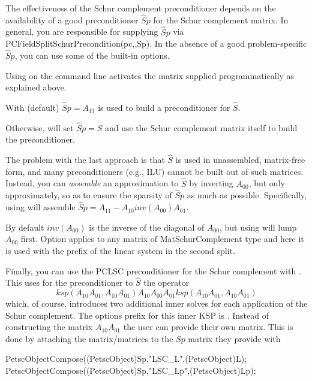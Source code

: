 The effectiveness of the Schur complement preconditioner depends on the availability of a good preconditioner $\hat Sp$ for the Schur complement matrix.
In general, you are responsible for supplying $\hat Sp$ via
PCFieldSplitSchurPrecondition(pc,,Sp).
In the absence of a good
problem-specific $\hat Sp$, you can use some of the built-in options.

Using  on the command line activates
the matrix supplied programmatically as explained above.

With  (default) $\hat Sp = A_{11}$ is used to build a
preconditioner for $\hat S$.

Otherwise,  will set $\hat Sp = \hat S$ and use the Schur complement matrix itself to build the preconditioner.

The problem with the last approach is that $\hat S$ is used in unassembled, matrix-free form, and many preconditioners (e.g., ILU) cannot be built out of
such matrices. Instead, you can \emph{assemble}  an approximation to $\hat S$ by inverting $A_{00}$, but only approximately, so as to ensure the sparsity of $\hat Sp$ as much as possible.
Specifically, using  will assemble $\hat Sp = A_{11} - A_{10} inv(A_{00}) A_{01}$.

By default $inv(A_{00})$ is the inverse of the diagonal of $A_{00}$, but using  will lump $A_{00}$ first.  Option 
applies to any matrix of MatSchurComplement type and here it is used with the prefix  of the linear system in the second split.

Finally, you can use the PCLSC preconditioner for the Schur complement with . This uses for the preconditioner to $\hat{S}$ the operator
\[
 ksp(A_{10} A_{01},A_{10} A_{01}) A_{10} A_{00} A_{01} ksp(A_{10} A_{01},A_{10} A_{01})
\]
 which, of course, introduces two additional inner solves for each application of the Schur complement. The options prefix for this inner KSP is . Instead of constructing the matrix $A_{10} A_{01}$ the user can provide their own matrix. This is done by attaching the matrix/matrices to the $ Sp $ matrix they provide with
\begin{tabbing}
 PetscObjectCompose((PetscObject)Sp,"LSC\_L",(PetscObject)L); \\
 PetscObjectCompose((PetscObject)Sp,"LSC\_Lp",(PetscObject)Lp);
\end{tabbing}

